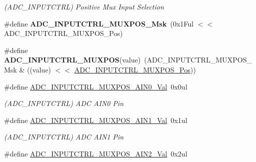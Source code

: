 \begin{DoxyCompactItemize}
\begin{DoxyCompactList}\small\item\em (A\+D\+C\+\_\+\+I\+N\+P\+U\+T\+C\+T\+R\+L) Positive Mux Input Selection \end{DoxyCompactList}\item 
\hypertarget{group___s_a_m_l21___a_d_c_ga2a4879aff5af3c137d6e63102c94b804}{}\#define {\bfseries A\+D\+C\+\_\+\+I\+N\+P\+U\+T\+C\+T\+R\+L\+\_\+\+M\+U\+X\+P\+O\+S\+\_\+\+Msk}~(0x1\+Ful $<$$<$ A\+D\+C\+\_\+\+I\+N\+P\+U\+T\+C\+T\+R\+L\+\_\+\+M\+U\+X\+P\+O\+S\+\_\+\+Pos)\label{group___s_a_m_l21___a_d_c_ga2a4879aff5af3c137d6e63102c94b804}

\item 
\hypertarget{group___s_a_m_l21___a_d_c_gac4fa999bded624468a8fe33fa727c831}{}\#define {\bfseries A\+D\+C\+\_\+\+I\+N\+P\+U\+T\+C\+T\+R\+L\+\_\+\+M\+U\+X\+P\+O\+S}(value)~(A\+D\+C\+\_\+\+I\+N\+P\+U\+T\+C\+T\+R\+L\+\_\+\+M\+U\+X\+P\+O\+S\+\_\+\+Msk \& ((value) $<$$<$ \hyperlink{group___s_a_m_l21___a_d_c_ga583868be285e1c06c9a93dfd552d8c6a}{A\+D\+C\+\_\+\+I\+N\+P\+U\+T\+C\+T\+R\+L\+\_\+\+M\+U\+X\+P\+O\+S\+\_\+\+Pos}))\label{group___s_a_m_l21___a_d_c_gac4fa999bded624468a8fe33fa727c831}

\item 
\hypertarget{group___s_a_m_l21___a_d_c_ga435301c77fea1abf66a3b77a1150cfbe}{}\#define \hyperlink{group___s_a_m_l21___a_d_c_ga435301c77fea1abf66a3b77a1150cfbe}{A\+D\+C\+\_\+\+I\+N\+P\+U\+T\+C\+T\+R\+L\+\_\+\+M\+U\+X\+P\+O\+S\+\_\+\+A\+I\+N0\+\_\+\+Val}~0x0ul\label{group___s_a_m_l21___a_d_c_ga435301c77fea1abf66a3b77a1150cfbe}

\begin{DoxyCompactList}\small\item\em (A\+D\+C\+\_\+\+I\+N\+P\+U\+T\+C\+T\+R\+L) A\+D\+C A\+I\+N0 Pin \end{DoxyCompactList}\item 
\hypertarget{group___s_a_m_l21___a_d_c_ga2687e7ffb68e6da887146f2c62c18f6b}{}\#define \hyperlink{group___s_a_m_l21___a_d_c_ga2687e7ffb68e6da887146f2c62c18f6b}{A\+D\+C\+\_\+\+I\+N\+P\+U\+T\+C\+T\+R\+L\+\_\+\+M\+U\+X\+P\+O\+S\+\_\+\+A\+I\+N1\+\_\+\+Val}~0x1ul\label{group___s_a_m_l21___a_d_c_ga2687e7ffb68e6da887146f2c62c18f6b}

\begin{DoxyCompactList}\small\item\em (A\+D\+C\+\_\+\+I\+N\+P\+U\+T\+C\+T\+R\+L) A\+D\+C A\+I\+N1 Pin \end{DoxyCompactList}\item 
\hypertarget{group___s_a_m_l21___a_d_c_gacc4be6c554e9992353f7cfc97612ad3c}{}\#define \hyperlink{group___s_a_m_l21___a_d_c_gacc4be6c554e9992353f7cfc97612ad3c}{A\+D\+C\+\_\+\+I\+N\+P\+U\+T\+C\+T\+R\+L\+\_\+\+M\+U\+X\+P\+O\+S\+\_\+\+A\+I\+N2\+\_\+\+Val}~0x2ul\label{group___s_a_m_l21___a_d_c_gacc4be6c554e9992353f7cfc97612ad3c}


\end{DoxyCompactItemize}

